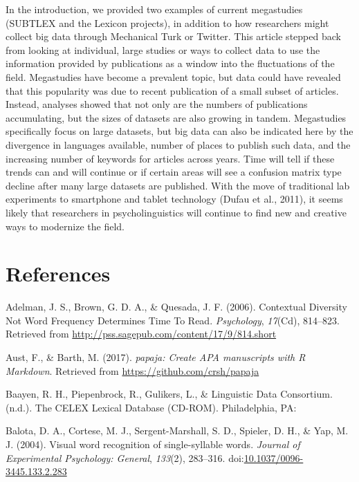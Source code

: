 \documentclass[english,man]{apa6}
\theoremstyle{definition}
\theoremstyle{definition}
\theoremstyle{definition}
\theoremstyle{remark}
\begin{document}
In the introduction, we provided two examples of current megastudies
(SUBTLEX and the Lexicon projects), in addition to how researchers might
collect big data through Mechanical Turk or Twitter. This article
stepped back from looking at individual, large studies or ways to
collect data to use the information provided by publications as a window
into the fluctuations of the field. Megastudies have become a prevalent
topic, but data could have revealed that this popularity was due to
recent publication of a small subset of articles. Instead, analyses
showed that not only are the numbers of publications accumulating, but
the sizes of datasets are also growing in tandem. Megastudies
specifically focus on large datasets, but big data can also be indicated
here by the divergence in languages available, number of places to
publish such data, and the increasing number of keywords for articles
across years. Time will tell if these trends can and will continue or if
certain areas will see a confusion matrix type decline after many large
datasets are published. With the move of traditional lab experiments to
smartphone and tablet technology (Dufau et al., 2011), it seems likely
that researchers in psycholinguistics will continue to find new and
creative ways to modernize the field.

\newpage

\section{References}\label{references}

\setlength{\parindent}{-0.5in} \setlength{\leftskip}{0.5in}

\hypertarget{refs}{}
\hypertarget{ref-Adelman2006}{}
Adelman, J. S., Brown, G. D. A., \& Quesada, J. F. (2006). Contextual
Diversity Not Word Frequency Determines Time To Read. \emph{Psychology},
\emph{17}(Cd), 814--823. Retrieved from
\url{http://pss.sagepub.com/content/17/9/814.short}

\hypertarget{ref-R-papaja}{}
Aust, F., \& Barth, M. (2017). \emph{papaja: Create APA manuscripts with
R Markdown}. Retrieved from \url{https://github.com/crsh/papaja}

\hypertarget{ref-Baayen}{}
Baayen, R. H., Piepenbrock, R., Gulikers, L., \& Linguistic Data
Consortium. (n.d.). The CELEX Lexical Database (CD-ROM). Philadelphia,
PA:

\hypertarget{ref-Balota2004}{}
Balota, D. A., Cortese, M. J., Sergent-Marshall, S. D., Spieler, D. H.,
\& Yap, M. J. (2004). Visual word recognition of single-syllable words.
\emph{Journal of Experimental Psychology: General}, \emph{133}(2),
283--316.
doi:\href{https://doi.org/10.1037/0096-3445.133.2.283}{10.1037/0096-3445.133.2.283}
\end{document}
